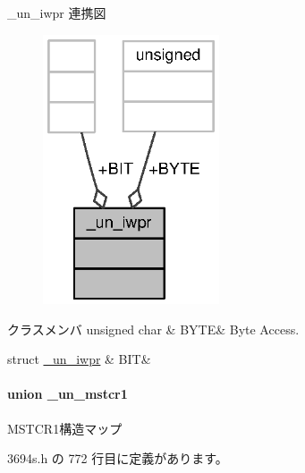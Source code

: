 \+\_\+un\+\_\+iwpr 連携図
\nopagebreak
\begin{figure}[H]
\begin{center}
\leavevmode
\includegraphics[width=148pt]{d2/d17/union__un__iwpr__coll__graph}
\end{center}
\end{figure}
\begin{DoxyFields}{クラスメンバ}
unsigned char\label{3694s_8h_a825258905995510cf2d898f97ca61c02}
&
B\+Y\+T\+E&
Byte Access. \\
\hline

struct \hyperlink{3694s_8h_d6/dcd/struct__un__iwpr_8BIT}{\+\_\+un\+\_\+iwpr}\label{3694s_8h_a7170e6ef843f4afc585893a4c99adc40}
&
B\+I\+T&
\\
\hline

\end{DoxyFields}
\label{union__un__mstcr1}
\paragraph{union \+\_\+un\+\_\+mstcr1}
M\+S\+T\+C\+R1構造マップ 

 3694s.\+h の 772 行目に定義があります。



